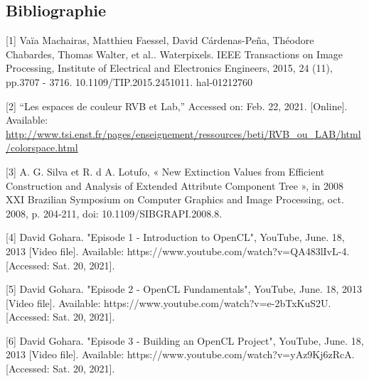 \documentclass[notitlepage, a4paper, 12pt]{report}
\begin{document}
\begin{flushleft}
\appendix
\chapter{Bibliographie}

[1] Vaïa Machairas, Matthieu Faessel, David Cárdenas-Peña, Théodore Chabardes, Thomas Walter, et
al.. Waterpixels. IEEE Transactions on Image Processing, Institute of Electrical and Electronics
Engineers, 2015, 24 (11), pp.3707 - 3716. 10.1109/TIP.2015.2451011. hal-01212760

\vspace{3mm}

[2] “Les espaces de couleur RVB et Lab,” Accessed on: Feb. 22, 2021. [Online]. Available: \url{http://www.tsi.enst.fr/pages/enseignement/ressources/beti/RVB_ou_LAB/html/colorspace.html}

\vspace{3mm}

[3]	A. G. Silva et R. d A. Lotufo, « New Extinction Values from Efficient Construction and Analysis of Extended Attribute Component Tree », in 2008 XXI Brazilian Symposium on Computer Graphics and Image Processing, oct. 2008, p. 204‑211, doi: 10.1109/SIBGRAPI.2008.8.

\vspace{3mm}

[4] David Gohara. "Episode 1 - Introduction to OpenCL", YouTube, June. 18, 2013 [Video file]. Available: https://www.youtube.com/watch?v=QA483lIvL-4. [Accessed: Sat. 20, 2021].

\vspace{3mm}

[5] David Gohara. "Episode 2 - OpenCL Fundamentals", YouTube, June. 18, 2013 [Video file]. Available: https://www.youtube.com/watch?v=e-2bTxKuS2U. [Accessed: Sat. 20, 2021].

\vspace{3mm}

[6] David Gohara. "Episode 3 - Building an OpenCL Project", YouTube, June. 18, 2013 [Video file]. Available: https://www.youtube.com/watch?v=yAz9Kj6zRcA. [Accessed: Sat. 20, 2021].

\end{flushleft}
\end{document}
